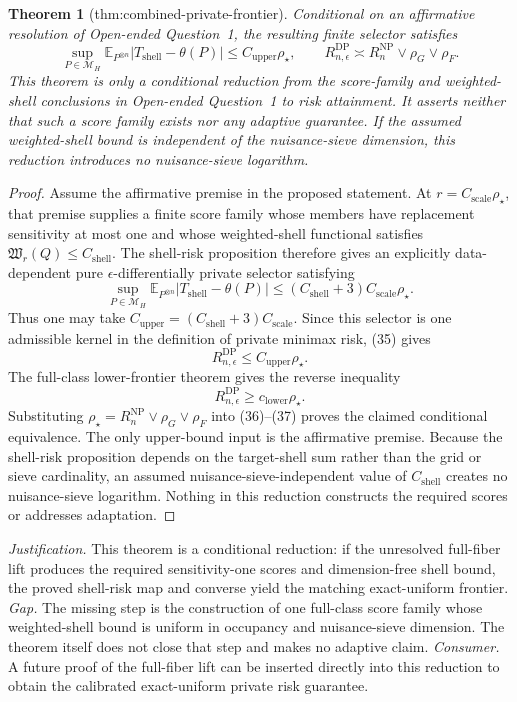 \documentclass{article}
\newtheorem{theorem}{Theorem}
\begin{document}
\begin{theorem}[thm:combined-private-frontier]\label{thm:combined-private-frontier}
Conditional on an affirmative resolution of Open-ended Question~1, the resulting finite selector satisfies
\[
 \sup_{P\in\mathcal M_H}\mathbb E_{P^{\otimes n}}
 |T_{\mathrm{shell}}-\theta(P)|
 \le C_{\mathrm{upper}}\rho_\star,
 \qquad
 R_{n,\epsilon}^{\mathrm{DP}}
 \asymp R_n^{\mathrm{NP}}\vee\rho_G\vee\rho_F.
\]
This theorem is only a conditional reduction from the score-family and weighted-shell conclusions in Open-ended Question~1 to risk attainment.  It asserts neither that such a score family exists nor any adaptive guarantee.  If the assumed weighted-shell bound is independent of the nuisance-sieve dimension, this reduction introduces no nuisance-sieve logarithm.
\end{theorem}
\begin{proof}
Assume the affirmative premise in the proposed statement.  At \(r=C_{\mathrm{scale}}\rho_\star\), that premise supplies a finite score family whose members have replacement sensitivity at most one and whose weighted-shell functional satisfies \(\mathfrak W_r(Q)\le C_{\mathrm{shell}}\).  The shell-risk proposition therefore gives an explicitly data-dependent pure \(\epsilon\)-differentially private selector satisfying
\[
 \sup_{P\in\mathcal M_H}\mathbb E_{P^{\otimes n}}
 |T_{\mathrm{shell}}-\theta(P)|
 \le(C_{\mathrm{shell}}+3)C_{\mathrm{scale}}\rho_\star.
 \tag{35}
\]
Thus one may take \(C_{\mathrm{upper}}=(C_{\mathrm{shell}}+3)C_{\mathrm{scale}}\).  Since this selector is one admissible kernel in the definition of private minimax risk, (35) gives
\[
 R_{n,\epsilon}^{\mathrm{DP}}\le C_{\mathrm{upper}}\rho_\star.
 \tag{36}
\]
The full-class lower-frontier theorem gives the reverse inequality
\[
 R_{n,\epsilon}^{\mathrm{DP}}\ge c_{\mathrm{lower}}\rho_\star.
 \tag{37}
\]
Substituting \(\rho_\star=R_n^{\mathrm{NP}}\vee\rho_G\vee\rho_F\) into (36)--(37) proves the claimed conditional equivalence.  The only upper-bound input is the affirmative premise.  Because the shell-risk proposition depends on the target-shell sum rather than the grid or sieve cardinality, an assumed nuisance-sieve-independent value of \(C_{\mathrm{shell}}\) creates no nuisance-sieve logarithm.  Nothing in this reduction constructs the required scores or addresses adaptation.
\end{proof}
\par\smallskip\noindent \textit{Justification.} This theorem is a conditional reduction: if the unresolved full-fiber lift produces the required sensitivity-one scores and dimension-free shell bound, the proved shell-risk map and converse yield the matching exact-uniform frontier. \textit{Gap.} The missing step is the construction of one full-class score family whose weighted-shell bound is uniform in occupancy and nuisance-sieve dimension.  The theorem itself does not close that step and makes no adaptive claim. \textit{Consumer.} A future proof of the full-fiber lift can be inserted directly into this reduction to obtain the calibrated exact-uniform private risk guarantee.
\end{document}
